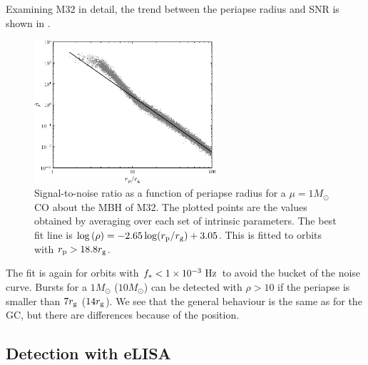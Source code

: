 Examining M32 in detail, the trend between the periapse radius and SNR is shown in .
\begin{figure}[!htp]
  \begin{center}
  \includegraphics[width=0.6\textwidth]{./images/Fig_SNR_M32}
    \caption{Signal-to-noise ratio as a function of periapse radius for a $\mu = 1 M_\odot$ CO about the MBH of M32. The plotted points are the values obtained by averaging over each set of intrinsic parameters. The best fit line is $\log\left(\rho\right) = -2.65\log(r_\mathrm{p}/r_\mathrm{g}) + 3.05$. This is fitted to orbits with $r_\mathrm{p} > 18.8 r_\mathrm{g}$.\label{fig:SNR-M32}} %
  \end{center}
\end{figure}
The fit is again for orbits with $f_\ast < 1 \times 10^{-3}~\mathrm{Hz}$ to avoid the bucket of the noise curve. Bursts for a $1 M_\odot$ ($10 M_\odot$) can be detected with $\rho > 10$ if the periapse is smaller than $7 r_\mathrm{g}$ ($14 r_\mathrm{g}$). We see that the general behaviour is the same as for the GC, but there are differences because of the position.

\subsection{Detection with eLISA}

